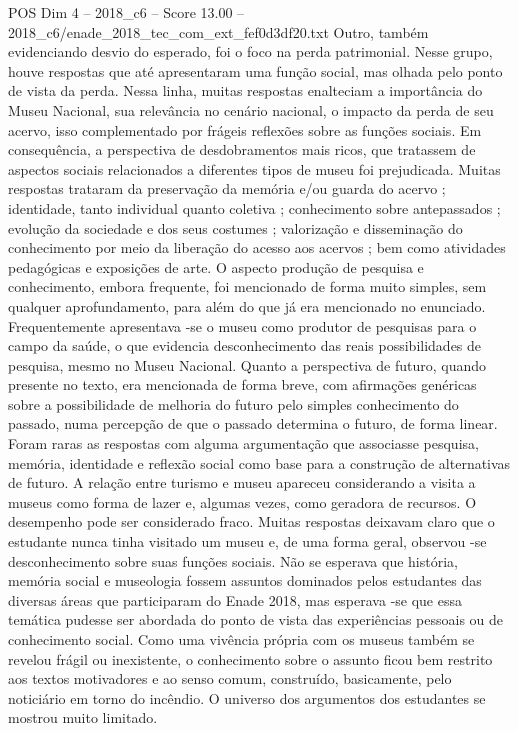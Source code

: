\begin{textsample}{POS Dim 4 – 2018\_c6 – Score 13.00 – 2018\_c6/enade\_2018\_tec\_com\_ext\_fef0d3df20.txt}
Outro, também evidenciando desvio do esperado, foi o foco na perda patrimonial.
Nesse grupo, houve respostas que até apresentaram uma função social, mas olhada pelo ponto de vista da perda.
Nessa linha, muitas respostas enalteciam a importância do Museu Nacional, sua relevância no cenário nacional, o impacto da perda de seu acervo, isso complementado por frágeis reflexões sobre as funções sociais.
Em consequência, a perspectiva de desdobramentos mais ricos, que tratassem de aspectos sociais relacionados a diferentes tipos de museu foi prejudicada.
Muitas respostas trataram da preservação da memória e/ou guarda do acervo ; identidade, tanto individual quanto coletiva ; conhecimento sobre antepassados ; evolução da sociedade e dos seus costumes ; valorização e disseminação do conhecimento por meio da liberação do acesso aos acervos ; bem como atividades pedagógicas e exposições de arte.
O aspecto produção de pesquisa e conhecimento, embora frequente, foi mencionado de forma muito simples, sem qualquer aprofundamento, para além do que já era mencionado no enunciado.
Frequentemente apresentava -se o museu como produtor de pesquisas para o campo da saúde, o que evidencia desconhecimento das reais possibilidades de pesquisa, mesmo no Museu Nacional.
Quanto a perspectiva de futuro, quando presente no texto, era mencionada de forma breve, com afirmações genéricas sobre a possibilidade de melhoria do futuro pelo simples conhecimento do passado, numa percepção de que o passado determina o futuro, de forma linear.
Foram raras as respostas com alguma argumentação que associasse pesquisa, memória, identidade e reflexão social como base para a construção de alternativas de futuro.
A relação entre turismo e museu apareceu considerando a visita a museus como forma de lazer e, algumas vezes, como geradora de recursos.
O desempenho pode ser considerado fraco.
Muitas respostas deixavam claro que o estudante nunca tinha visitado um museu e, de uma forma geral, observou -se desconhecimento sobre suas funções sociais.
Não se esperava que história, memória social e museologia fossem assuntos dominados pelos estudantes das diversas áreas que participaram do Enade 2018, mas esperava -se que essa temática pudesse ser abordada do ponto de vista das experiências pessoais ou de conhecimento social.
Como uma vivência própria com os museus também se revelou frágil ou inexistente, o conhecimento sobre o assunto ficou bem restrito aos textos motivadores e ao senso comum, construído, basicamente, pelo noticiário em torno do incêndio.
O universo dos argumentos dos estudantes se mostrou muito limitado.

\end{textsample}
